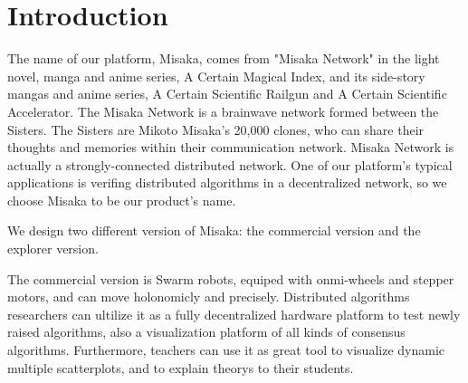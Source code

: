 \documentclass[sigconf]{acmart}
\begin{document}



\maketitle

\section{Introduction}

The name of our platform, Misaka, comes from "Misaka Network" in the light novel, manga and anime series, A Certain Magical Index, and its side-story mangas and anime series, A Certain Scientific Railgun and A Certain Scientific Accelerator. The Misaka Network is a brainwave network formed between the Sisters. The Sisters are Mikoto Misaka's 20,000 clones, who can share their thoughts and memories within their communication network. Misaka Network is actually a strongly-connected distributed network. One of our platform's typical applications is verifing distributed algorithms in a decentralized network, so we choose Misaka to be our product's name.

We design two different version of Misaka: the commercial version and the explorer version. 

The commercial version is Swarm robots, equiped with onmi-wheels and stepper motors, and can move holonomicly and precisely. Distributed algorithms researchers can ultilize it as a fully decentralized hardware platform to test newly raised algorithms, also a visualization platform of all kinds of consensus algorithms. Furthermore, teachers can use it as great tool to visualize dynamic multiple scatterplots, and to explain theorys to their students. 
\end{document}
